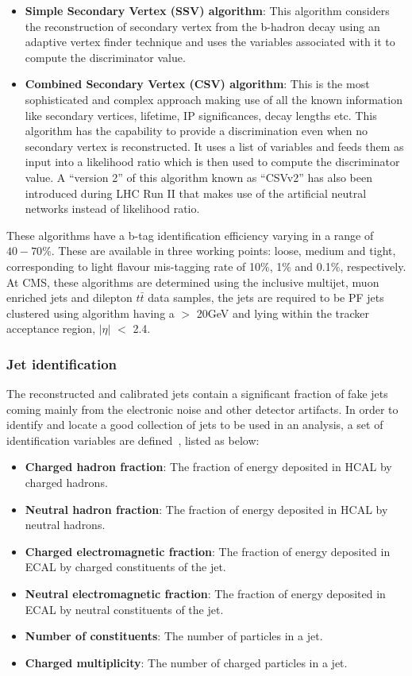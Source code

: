 \begin{itemize}[leftmargin=*]
\item {\bf{Simple Secondary Vertex (SSV) algorithm}}: This algorithm considers the reconstruction of secondary vertex from the b-hadron decay using an adaptive
  vertex finder technique and uses the variables associated with it to compute the discriminator value.
\item {\bf{Combined Secondary Vertex (CSV) algorithm}}: This is the most sophisticated and complex approach making use of all the known information like
  secondary vertices, lifetime, IP significances, decay lengths etc. This algorithm has the capability to provide a discrimination even when no secondary vertex is
  reconstructed. It uses a list of variables and feeds them as input into a likelihood ratio which is then used to compute the discriminator value.
  A ``version 2'' of this algorithm known as ``CSVv2'' has
  also been introduced during LHC Run II that makes use of the artificial neutral networks instead of likelihood ratio.   
\end{itemize}
\vspace{-0.2in}
These algorithms have a b-tag identification efficiency varying in a range of $40-70\%$. These are available in three working points:
loose, medium and tight, corresponding to light flavour mis-tagging rate of 10$\%$, 1$\%$ and 0.1$\%$, respectively.
At CMS, these algorithms are determined using the inclusive multijet, muon enriched jets and dilepton $t\bar{t}$ data samples,
the jets are required to be PF jets clustered using \antikt algorithm having a \pt $>$ 20\unit{GeV} and lying within the tracker acceptance region, $|\eta|$ $<$ 2.4. 
\subsubsection{Jet identification}\label{Se:JetID}
The reconstructed and calibrated jets contain a significant fraction of fake jets coming mainly from the electronic noise and other detector artifacts.
In order to identify and locate a good collection of jets to be used in an analysis, a set of identification variables are defined~\cite{Web:JetId}, listed as below:
\vspace{-0.1in}
\begin{itemize}[leftmargin=*]
  \setlength\itemsep{0.1em}
\item {\bf{Charged hadron fraction}}: The fraction of energy deposited in HCAL by charged hadrons.
\item {\bf{Neutral hadron fraction}}: The fraction of energy deposited in HCAL by neutral hadrons.
\item {\bf{Charged electromagnetic fraction}}: The fraction of energy deposited in ECAL by charged constituents of the jet.
\item {\bf{Neutral electromagnetic fraction}}: The fraction of energy deposited in ECAL by neutral constituents of the jet.
\item {\bf{Number of constituents}}: The number of particles in a jet.
\item {\bf{Charged multiplicity}}: The number of charged particles in a jet.
\end{itemize}
\vspace{-0.1in}
